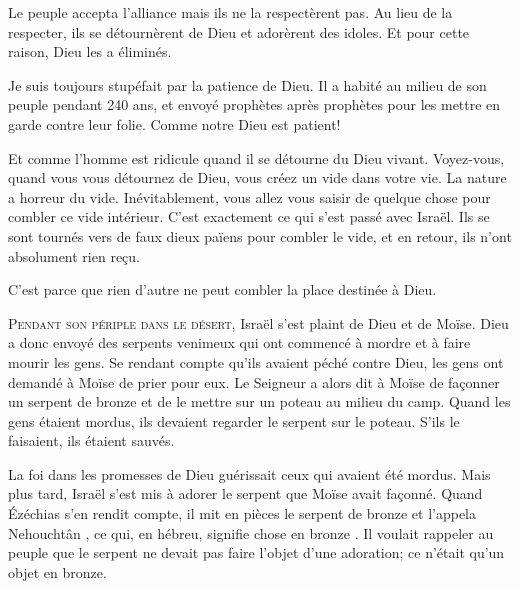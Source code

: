 Le peuple accepta l'alliance \ocadr mais ils ne la respectèrent pas.
 Au lieu de la respecter, ils se détournèrent de Dieu
 et adorèrent des idoles. Et pour cette raison, Dieu les a éliminés. 


Je suis toujours stupéfait par la patience de Dieu.
 Il a habité au milieu de son peuple pendant 240 ans,
 et envoyé prophètes après prophètes pour les mettre en garde
 contre leur folie. Comme notre Dieu est patient! 

Et comme l'homme est ridicule quand il se détourne du Dieu vivant.
 Voyez-vous, quand vous vous détournez de Dieu,
 vous créez un vide dans votre vie. La nature a horreur du vide.
 Inévitablement, vous allez vous saisir de quelque chose pour combler
 ce vide intérieur. C'est exactement ce qui s'est passé avec Israël.
 Ils se sont tournés vers de faux dieux païens pour combler le vide,
 et en retour, ils n'ont absolument rien reçu. 

C'est parce que rien d'autre ne peut combler la place destinée à Dieu. 

\dvrule






\lettrine{P}{endant son périple dans le désert,} Israël s'est plaint
 de Dieu et de Moïse.
 Dieu a donc envoyé des serpents venimeux qui ont commencé à mordre
 et à faire mourir les gens.
 Se rendant compte qu'ils avaient péché contre Dieu,
 les gens ont demandé à Moïse de prier pour eux.
 Le Seigneur a alors dit à Moïse de façonner un serpent de bronze
 et de le mettre sur un poteau au milieu du camp.
 Quand les gens étaient mordus, ils devaient regarder le serpent
 sur le poteau. S'ils le faisaient, ils étaient sauvés. 

La foi dans les promesses de Dieu guérissait ceux qui avaient été mordus.
 Mais plus tard, Israël s'est mis à adorer le serpent
 que Moïse avait façonné. Quand Ézéchias s'en rendit compte,
 il mit en pièces le serpent de bronze et l'appela 
 \og Nehouchtân \fg{},
 ce qui, en hébreu, signifie \og chose en bronze \fg{}.
 Il voulait rappeler au peuple que le serpent ne devait pas faire
 l'objet d'une adoration; ce n'était qu'un objet en bronze. 


